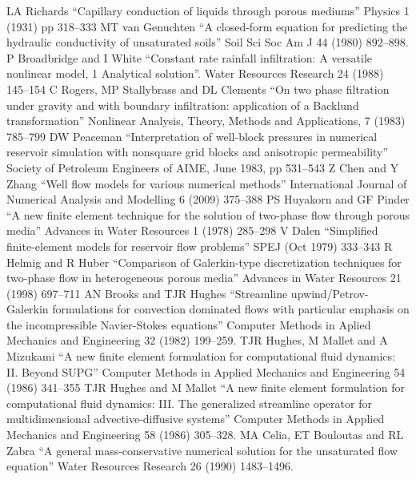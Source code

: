\documentclass[]{scrreprt}
\begin{document}

\begin{thebibliography}{99}
LA Richards ``Capillary conduction of
  liquids through porous mediums''   Physics 1 (1931) pp 318--333
MT van Genuchten ``A closed-form equation
  for predicting the hydraulic conductivity of unsaturated soils''
  Soil Sci Soc Am J 44 (1980) 892--898.
P Broadbridge and I White ``Constant rate rainfall
  infiltration: A versatile nonlinear model, 1 Analytical solution''.
  Water Resources Research 24 (1988) 145--154
C Rogers, MP Stallybrass and DL Clements ``On two
  phase filtration under gravity and with boundary infiltration:
  application of a Backlund transformation'' Nonlinear Analysis,
  Theory, Methods and Applications, 7 (1983) 785--799
DW Peaceman ``Interpretation of well-block
  pressures in numerical reservoir simulation with nonsquare grid
  blocks and anisotropic permeability'' Society of Petroleum Engineers
  of AIME, June 1983, pp 531--543
Z Chen and Y Zhang ``Well flow models for various
  numerical methods'' International Journal of Numerical Analysis and
  Modelling 6 (2009) 375--388
PS Huyakorn and GF Pinder ``A new finite element
  technique for the solution of two-phase flow through porous media''
  Advances in Water Resources 1 (1978) 285--298
V Dalen ``Simplified finite-element models for
  reservoir flow problems'' SPEJ (Oct 1979) 333--343
R Helmig and R Huber ``Comparison of Galerkin-type
  discretization techniques for two-phase flow in heterogeneous porous
  media''  Advances in Water Resources 21 (1998) 697--711
AN Brooks and TJR Hughes ``Streamline
  upwind/Petrov-Galerkin formulations for convection dominated flows
  with particular emphasis on the incompressible Navier-Stokes
  equations''  Computer Methods in Aplied Mechanics and Engineering 32
  (1982) 199--259.
TJR Hughes, M Mallet and A Mizukami ``A new finite element
  formulation for computational fluid dynamics: II. Beyond SUPG''
  Computer Methods in Applied Mechanics and Engineering 54 (1986) 341--355
TJR Hughes and M Mallet ``A new finite element
  formulation for computational fluid dynamics: III. The generalized
  streamline operator for multidimensional advective-diffusive
  systems''  Computer Methods in Applied Mechanics and Engineering 58
  (1986) 305--328.
MA Celia, ET Bouloutas and RL Zabra ``A general
  mass-conservative numerical solution for the unsaturated flow
  equation''  Water Resources Research 26 (1990) 1483--1496.
\end{thebibliography}
\end{document}
